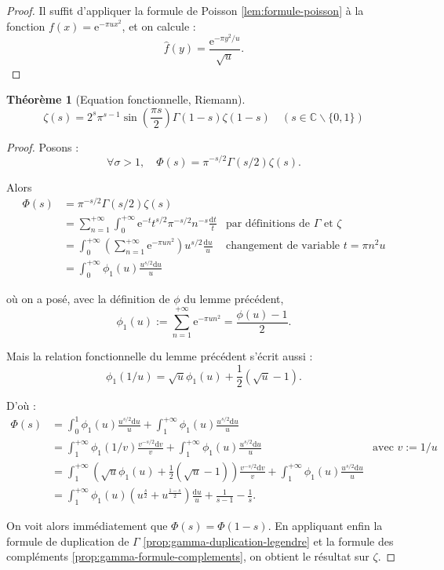 \documentclass[french]{report}
\newtheorem{theorem}{Théorème}[section]
\begin{document}
\begin{proof}
  Il suffit d'appliquer la formule de Poisson \ref{lem:formule-poisson} à la fonction $f(x)=\mathrm{e}^{-\pi ux^2}$, et on calcule :
  \[
    \hat{f}(y) = \frac{\mathrm{e}^{-\pi y^2/u}}{\sqrt{u}}.
  \]
\end{proof}

\begin{theorem}[Equation fonctionnelle, Riemann]\label{thm:equation-fonctionnelle}
  \[ \zeta(s) = 2^s\pi^{s-1}\sin\left(\frac{\pi s}{2}\right)\Gamma(1-s)\zeta(1-s)\quad (s\in\mathbb{C}\backslash\{0,1\}) \]
\end{theorem}

\begin{proof}
  Posons :
  \[
    \forall\sigma>1,\quad
    \Phi(s)=\pi^{-s/2}\Gamma(s/2)\zeta(s).
  \]

  Alors
  \begin{align*}
    \Phi(s)
    &= \pi^{-s/2}\Gamma(s/2)\zeta(s) & \\
    &= \sum_{n=1}^{+\infty}\int_0^{+\infty}\mathrm{e}^{-t}t^{s/2}\pi^{-s/2}n^{-s}\frac{\mathrm{d}t}{t}
    & \text{par définitions de $\Gamma$ et $\zeta$} \\
    &= \int_0^{+\infty}\left(\sum_{n=1}^{+\infty}\mathrm{e}^{-\pi un^2}\right)u^{s/2}\frac{\mathrm{d}u}{u}
    & \text{changement de variable $t=\pi n^2u$} \\
    &= \int_0^{+\infty}\phi_1(u)\frac{u^{s/2}\mathrm{d}u}{u}
  \end{align*}

  où on a posé, avec la définition de $\phi$ du lemme précédent,
  \[
    \phi_1(u)
    :=\sum_{n=1}^{+\infty}\mathrm{e}^{-\pi un^2}
    = \frac{\phi(u)-1}{2}.
  \]

  Mais la relation fonctionnelle du lemme précédent s'écrit aussi :
  \[
    \phi_1(1/u)=\sqrt{u}\phi_1(u)+\frac{1}{2}(\sqrt{u}-1).
  \]

  D'où :
  \begin{align}
    \Phi(s)
    &= \int_0^1\phi_1(u)\frac{u^{s/2}\mathrm{d}u}{u} + \int_1^{+\infty}\phi_1(u)\frac{u^{s/2}\mathrm{d}u}{u}
    & \\
    &= \int_1^{+\infty}\phi_1(1/v)\frac{v^{-s/2}\mathrm{d}v}{v} + \int_1^{+\infty}\phi_1(u)\frac{u^{s/2}\mathrm{d}u}{u}
    & \text{avec $v:=1/u$} \\
    &= \int_1^{+\infty}\left(\sqrt{u}\phi_1(u)+\frac{1}{2}(\sqrt{u}-1)\right)\frac{v^{-s/2}\mathrm{d}v}{v} + \int_1^{+\infty}\phi_1(u)\frac{u^{s/2}\mathrm{d}u}{u}
    & \\
    &= \int_1^{+\infty}\phi_1(u)\left(u^{\frac{s}{2}}+u^{\frac{1-s}{2}}\right)\frac{\mathrm{d}u}{u} + \frac{1}{s-1}-\frac{1}{s}.\label{eq:phi-avec-phi-1}
  \end{align}

  On voit alors immédiatement que $\Phi(s)=\Phi(1-s)$. En appliquant enfin la formule de duplication de $\Gamma$ \ref{prop:gamma-duplication-legendre} et la formule des compléments \ref{prop:gamma-formule-complements}, on obtient le résultat sur $\zeta$.
\end{proof}
\end{document}
